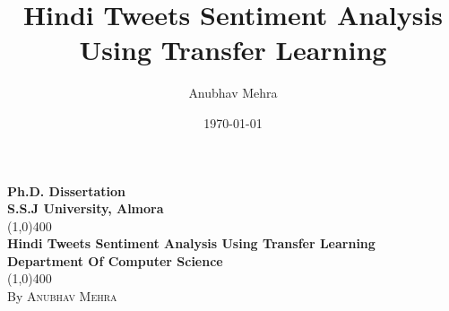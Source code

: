 \documentclass[a4paper, 12pt]{article}
\title{Hindi Tweets Sentiment Analysis Using Transfer Learning}
\author{Anubhav Mehra}
\date{\today}
\begin{document}
\begin{titlepage}
	\begin{center}
		\vspace*{1cm}
			\Huge{\textbf{Ph.D. Dissertation}}\\
			\Huge{\textbf{S.S.J University, Almora}}\\
			\vfill
			\line(1,0){400}\\[1mm]
			\large{\textbf{Hindi Tweets Sentiment Analysis Using Transfer Learning}}\\[3mm]
			\large{\textbf{Department Of Computer Science}}\\[1mm]
			\line(1,0){400}\\[1mm]
			By \textsc{Anubhav Mehra}
			
	\end{center}
\end{titlepage}
\end{document}
